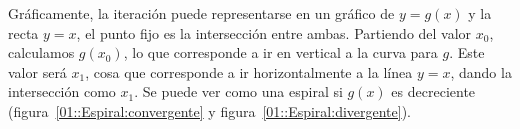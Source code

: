   Gráficamente,
  la iteración puede representarse en un gráfico de \(y = g(x)\)
  y la recta \(y = x\),
  el punto fijo es la intersección entre ambas.
  Partiendo del valor \(x_0\), calculamos \(g(x_0)\),
  lo que corresponde a ir en vertical a la curva para \(g\).
  Este valor será \(x_1\),
  cosa que corresponde a ir horizontalmente a la línea \(y = x\),
  dando la intersección como \(x_1\).
  Se puede ver como una espiral si \(g(x)\) es decreciente
  (figura~\ref{01::Espiral:convergente}
   y figura~\ref{01::Espiral:divergente}).
  \begin{figure}[ht]
    \centering
\end{figure}
